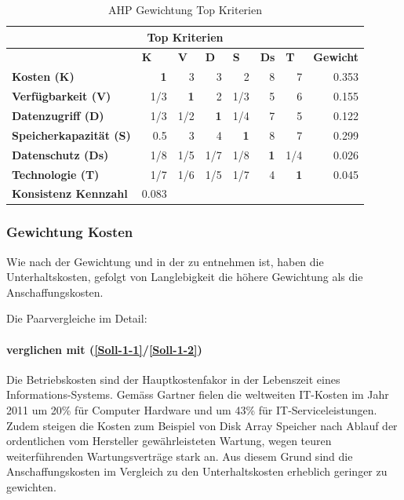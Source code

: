 \begin{table}[htbp]
\caption{AHP Gewichtung Top Kriterien}
\begin{tabular}{|l|r|r|r|r|r|r|r|}
\hline
\multicolumn{ 8}{|c|}{\textbf{Top Kriterien}} \\ \hline
 & \multicolumn{1}{l|}{\textbf{K}} & \multicolumn{1}{l|}{\textbf{V}} & \multicolumn{1}{l|}{\textbf{D}} & \multicolumn{1}{l|}{\textbf{S}} & \multicolumn{1}{l|}{\textbf{Ds}} & \multicolumn{1}{l|}{\textbf{T}} & \multicolumn{1}{l|}{\textbf{Gewicht}} \\ \hline
\textbf{Kosten (K)} & \textbf{1} & 3 & 3 & 2 & 8 & 7 & 0.353 \\ \hline
\textbf{Verfügbarkeit (V)} &  1/3 & \textbf{1} & 2 &  1/3 & 5 & 6 & 0.155 \\ \hline
\textbf{Datenzugriff (D)} &  1/3 &  1/2 & \textbf{1} &  1/4 & 7 & 5 & 0.122 \\ \hline
\textbf{Speicherkapazität (S)} & 0.5 & 3 & 4 & \textbf{1} & 8 & 7 & 0.299 \\ \hline
\textbf{Datenschutz (Ds)} &  1/8 &  1/5 &  1/7 &  1/8 & \textbf{1} &  1/4 & 0.026 \\ \hline
\textbf{Technologie (T)} &  1/7 &  1/6 &  1/5 &  1/7 & 4 & \textbf{1} & 0.045 \\ \hline
\textbf{Konsistenz Kennzahl} & 0.083  \\ \cline{1-2}
\end{tabular}
\label{AHPTop}
\end{table}

\subsubsection*{Gewichtung Kosten}

Wie nach der Gewichtung und in der  zu entnehmen ist, haben die Unterhaltskosten, gefolgt von Langlebigkeit die höhere Gewichtung als die Anschaffungskosten.

Die Paarvergleiche im Detail:

\paragraph*{ verglichen mit  (\ref{Soll-1-1}/\ref{Soll-1-2})}
Die Betriebskosten sind der Hauptkostenfakor in der Lebenszeit eines Informations-Systems. Gemäss Gartner fielen die weltweiten IT-Kosten im Jahr 2011 um 20\% für Computer Hardware und um 43\% für IT-Serviceleistungen. Zudem steigen die Kosten zum Beispiel von Disk Array Speicher nach Ablauf der ordentlichen vom Hersteller gewährleisteten Wartung, wegen teuren weiterführenden Wartungsverträge stark an.
Aus diesem Grund sind die Anschaffungskosten im Vergleich zu den Unterhaltskosten erheblich geringer zu gewichten.

